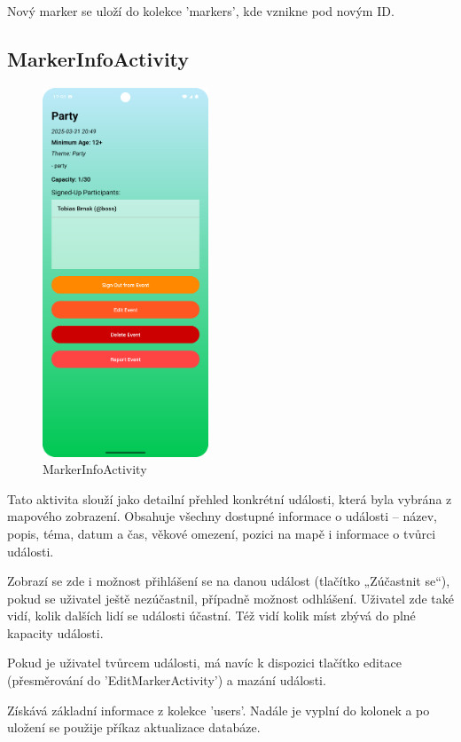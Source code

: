 Nový marker se uloží do kolekce 'markers', kde vznikne pod novým ID. \cite{AndroidDatePicker}





\subsection*{MarkerInfoActivity}

\begin{figure}[H]
    \centering
    \includegraphics[height=11cm]{Images/MarkerInfo.png}
    \caption{MarkerInfoActivity}
    \label{fig:Update-account}
\end{figure}

Tato aktivita slouží jako detailní přehled konkrétní události, která byla vybrána z mapového zobrazení. Obsahuje všechny dostupné informace o události – název, popis, téma, datum a čas, věkové omezení, pozici na mapě i informace o tvůrci události.

Zobrazí se zde i možnost přihlášení se na danou událost (tlačítko „Zúčastnit se“), pokud se uživatel ještě nezúčastnil, případně možnost odhlášení. Uživatel zde také vidí, kolik dalších lidí se události účastní. Též vidí kolik míst zbývá do plné kapacity události.

Pokud je uživatel tvůrcem události, má navíc k dispozici tlačítko editace (přesměrování do 'EditMarkerActivity') a mazání události.

Získává základní informace z kolekce 'users'. Nadále je vyplní do kolonek a po uložení se použije příkaz aktualizace databáze.

